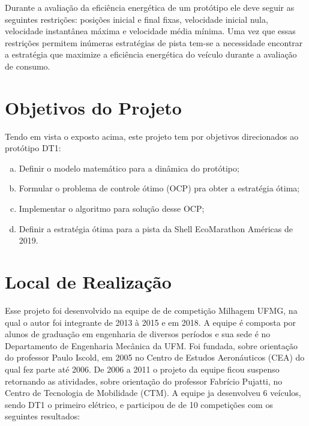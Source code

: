 Durante a avaliação da eficiência energética de um protótipo ele deve seguir as seguintes
restrições: posições inicial e final fixas, velocidade inicial nula, velocidade instantânea
máxima e velocidade média mínima. Uma vez que essas restrições permitem inúmeras
estratégias de pista tem-se a necessidade encontrar a estratégia que maximize a
eficiência energética do veículo durante a avaliação de consumo.


\section{Objetivos do Projeto}
\label{sec:objetivos}

Tendo em vista o exposto acima, este projeto tem por objetivos direcionados ao protótipo DT1:

\begin{enumerate}[(a)]
    \item Definir o modelo matemático para a dinâmica do protótipo;
    \item Formular o problema de controle ótimo (OCP) pra obter a estratégia ótima;
    \item Implementar o algoritmo para solução desse OCP;
    \item Definir a estratégia ótima para a pista da Shell EcoMarathon Américas de 2019.
\end{enumerate}

\section{Local de Realização}
\label{sec:empresa}


Esse projeto foi desenvolvido na equipe de de competição Milhagem UFMG, na qual o autor foi integrante de 2013 à 2015 e em 2018. A equipe é composta por alunos de graduação em engenharia de diversos períodos e sua sede é no Departamento de Engenharia Mecânica da UFM.
Foi fundada, sobre orientação do
professor Paulo Iscold, em 2005 no Centro de Estudos Aeronáuticos (CEA) do qual fez
parte até 2006.
De 2006 a 2011 o projeto da equipe ficou suspenso retornando as atividades, sobre orientação do professor Fabrício Pujatti, no Centro de Tecnologia
de Mobilidade (CTM). A equipe ja desenvolveu 6 veículos, sendo DT1 o primeiro elétrico, e participou de de 10 competições com os seguintes resultados:


